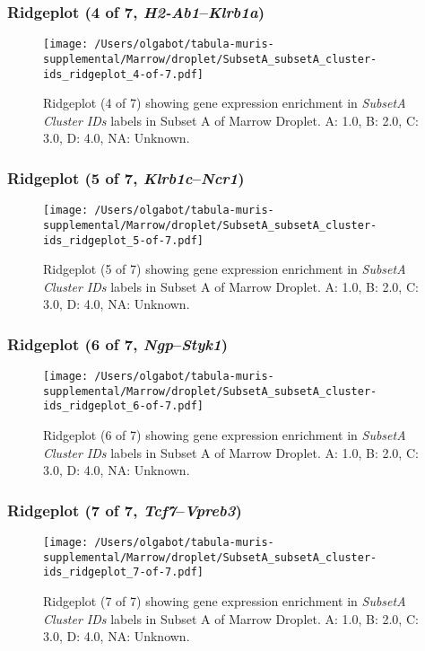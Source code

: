 \clearpage

\subsubsection{Ridgeplot (4 of 7, \emph{H2-Ab1}--\emph{Klrb1a})}
\begin{figure}[h]
\centering
\texttt{[image: /Users/olgabot/tabula-muris-supplemental/Marrow/droplet/SubsetA\_subsetA\_cluster-ids\_ridgeplot\_4-of-7.pdf]}

\caption{ Ridgeplot (4 of 7)  showing gene expression enrichment in \emph{SubsetA Cluster IDs} labels in Subset A of Marrow Droplet. A: 1.0, B: 2.0, C: 3.0, D: 4.0, NA: Unknown.}
\end{figure}


\clearpage

\subsubsection{Ridgeplot (5 of 7, \emph{Klrb1c}--\emph{Ncr1})}
\begin{figure}[h]
\centering
\texttt{[image: /Users/olgabot/tabula-muris-supplemental/Marrow/droplet/SubsetA\_subsetA\_cluster-ids\_ridgeplot\_5-of-7.pdf]}

\caption{ Ridgeplot (5 of 7)  showing gene expression enrichment in \emph{SubsetA Cluster IDs} labels in Subset A of Marrow Droplet. A: 1.0, B: 2.0, C: 3.0, D: 4.0, NA: Unknown.}
\end{figure}


\clearpage

\subsubsection{Ridgeplot (6 of 7, \emph{Ngp}--\emph{Styk1})}
\begin{figure}[h]
\centering
\texttt{[image: /Users/olgabot/tabula-muris-supplemental/Marrow/droplet/SubsetA\_subsetA\_cluster-ids\_ridgeplot\_6-of-7.pdf]}

\caption{ Ridgeplot (6 of 7)  showing gene expression enrichment in \emph{SubsetA Cluster IDs} labels in Subset A of Marrow Droplet. A: 1.0, B: 2.0, C: 3.0, D: 4.0, NA: Unknown.}
\end{figure}


\clearpage

\subsubsection{Ridgeplot (7 of 7, \emph{Tcf7}--\emph{Vpreb3})}
\begin{figure}[h]
\centering
\texttt{[image: /Users/olgabot/tabula-muris-supplemental/Marrow/droplet/SubsetA\_subsetA\_cluster-ids\_ridgeplot\_7-of-7.pdf]}

\caption{ Ridgeplot (7 of 7)  showing gene expression enrichment in \emph{SubsetA Cluster IDs} labels in Subset A of Marrow Droplet. A: 1.0, B: 2.0, C: 3.0, D: 4.0, NA: Unknown.}
\end{figure}


